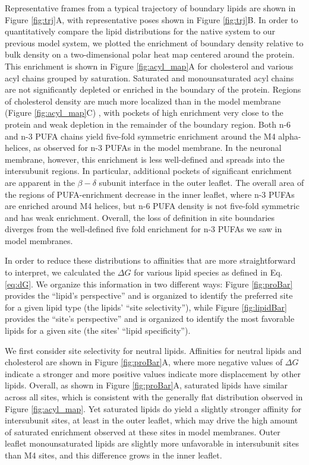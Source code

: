 Representative frames from a typical trajectory of boundary lipids are shown in Figure \ref{fig:trj}A, with representative poses shown in Figure \ref{fig:trj}B.  In order to quantitatively compare the lipid distributions for the native system to our previous model system, we plotted the enrichment of boundary density relative to bulk density on a two-dimensional polar heat map centered around the protein. This enrichment is shown in Figure \ref{fig:acyl_map}A for cholesterol and various acyl chains grouped by  saturation. Saturated and monounsaturated acyl chains are not significantly depleted or enriched in the boundary of the protein. Regions of cholesterol density are much more localized than in the model membrane (Figure \ref{fig:acyl_map}C) , with pockets of high enrichment very close to the protein and weak depletion in the remainder of the boundary region.  Both n-6 and n-3 PUFA chains yield five-fold symmetric enrichment around the M4 alpha-helices, as observed for n-3 PUFAs in the model membrane.  In the neuronal membrane, however, this enrichment is less well-defined and spreads into the intersubunit regions. In particular, additional pockets of significant enrichment are apparent in the $\beta-\delta$ subunit interface in the outer leaflet. The overall area of the regions of PUFA-enrichment decrease in the inner leaflet, where n-3 PUFAs are enriched around M4 helices, but n-6 PUFA density is not five-fold symmetric and has weak enrichment. Overall, the loss of definition in site boundaries diverges from the well-defined five fold enrichment for n-3 PUFAs we saw in model membranes\cite{Woods2019}. 

In order to reduce these distributions to affinities that are more straightforward to interpret, we calculated the \newaffinity{}  $\Delta G$ for various lipid species as defined in Eq. \ref{eq:dG}. We organize this information in two different ways: Figure \ref{fig:proBar} provides the ``lipid's perspective'' and is organized to identify the preferred site for a given lipid type (the lipids' ``site selectivity''), while Figure \ref{fig:lipidBar} provides the ``site's perspective'' and is organized to identify the most favorable lipids for a given site (the sites' ``lipid specificity''). 

We first consider site selectivity for neutral lipids. Affinities for neutral lipids and cholesterol are shown in Figure \ref{fig:proBar}A, where more negative values of $\Delta G$ indicate a stronger \newaffinity{} and more positive values indicate more displacement by other lipids.  Overall, as shown in Figure \ref{fig:proBar}A, saturated lipids have similar \newaffinities{} across all sites, which is consistent with the generally flat distribution observed in Figure \ref{fig:acyl_map}. Yet saturated lipids do yield a slightly stronger affinity for intersubunit sites, at least in the outer leaflet, which may drive the high amount of saturated enrichment observed at these sites in model membranes.  Outer leaflet monounsaturated lipids are slightly more unfavorable in intersubunit sites than M4 sites, and this difference grows in the inner leaflet. 

